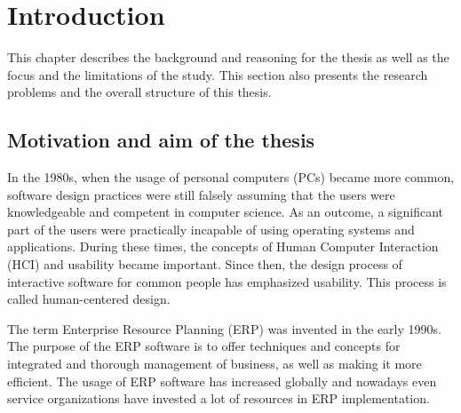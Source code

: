 \documentclass[12pt,a4paper,oneside,pdftex]{report}
\begin{document}
\label{pages-prelude}
\cleardoublepage

\startfirstchapter

\pagestyle{headings}


% 

\chapter{Introduction}
\label{chapter:introduction}
This chapter describes the background and reasoning for the thesis as well as the focus and the limitations of the study. This section also presents the research problems and the overall structure of this thesis. 

\section{Motivation and aim of the thesis}
\label{sec:motivationandaim}
In the 1980s, when the usage of personal computers (PCs) became more common, software design practices were still falsely assuming that the users were knowledgeable and competent in computer science. As an outcome, a significant part of the users were practically incapable of using operating systems and applications.
During these times, the concepts of Human Computer Interaction (HCI) and usability became important. Since then, the design process of interactive software for common people has emphasized usability. This process is called human-centered design. \cite{RefWorks:9}

The term Enterprise Resource Planning (ERP) was invented in the early 1990s.\cite{RefWorks:3} The purpose of the ERP software is to offer techniques and concepts for integrated and thorough management of business, as well as making it more efficient.
The usage of ERP software has increased globally and nowadays even service organizations have invested a lot of resources in ERP implementation.\cite{RefWorks:1, RefWorks:7} 
\end{document}
